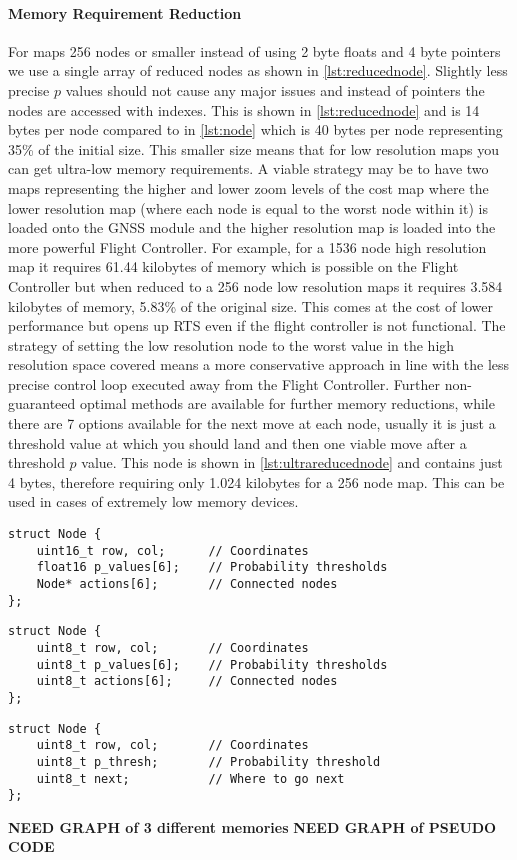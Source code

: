 \paragraph{Memory Requirement Reduction}
For maps 256 nodes or smaller instead of using 2 byte floats and 4 byte pointers we use a single array of reduced nodes as shown in \ref{lst:reducednode}. Slightly less precise $p$ values should not cause any major issues and instead of pointers the nodes are accessed with indexes. This is shown in \ref{lst:reducednode} and is 14 bytes per node compared to in \ref{lst:node} which is 40 bytes per node representing 35\% of the initial size.  This smaller size means that for low resolution maps you can get ultra-low memory requirements. A viable strategy may be to have two maps representing the higher and lower zoom levels of the cost map where the lower resolution map (where each node is equal to the worst node within it) is loaded onto the \gls{GNSS} module and the higher resolution map is loaded into the more powerful Flight Controller. For example, for a 1536 node high resolution map it requires 61.44 kilobytes of memory which is possible on the Flight Controller but when reduced to a 256 node low resolution maps it requires 3.584 kilobytes of memory, 5.83\% of the original size. This comes at the cost of lower performance but opens up \gls{RTS} even if the flight controller is not functional. The strategy of setting the low resolution node to the worst value in the high resolution space covered means a more conservative approach in line with the less precise control loop executed away from the Flight Controller. Further non-guaranteed optimal methods are available for further memory reductions,  while there are 7 options available for the next move at each node, usually it is just a threshold value at which you should land and then one viable move after a threshold $p$ value. This node is shown in \ref{lst:ultrareducednode} and contains just 4 bytes, therefore requiring only 1.024 kilobytes for a 256 node map. This can be used in cases of extremely low memory devices.
\begin{lstlisting}[caption={Node Structure},label={lst:node}]
struct Node {
    uint16_t row, col;      // Coordinates
    float16 p_values[6];    // Probability thresholds
    Node* actions[6];       // Connected nodes
};
\end{lstlisting}

\begin{lstlisting}[caption={Reduced Node Structure},label={lst:reducednode}]
struct Node {
    uint8_t row, col;       // Coordinates
    uint8_t p_values[6];    // Probability thresholds
    uint8_t actions[6];     // Connected nodes
};
\end{lstlisting}

\begin{lstlisting}[caption={Ultra Reduced Node Structure},label={lst:ultrareducednode}]
struct Node {
    uint8_t row, col;       // Coordinates
    uint8_t p_thresh;       // Probability threshold
    uint8_t next;           // Where to go next
};
\end{lstlisting}

\textbf{NEED GRAPH of 3 different memories}
\textbf{NEED GRAPH of PSEUDO CODE}
